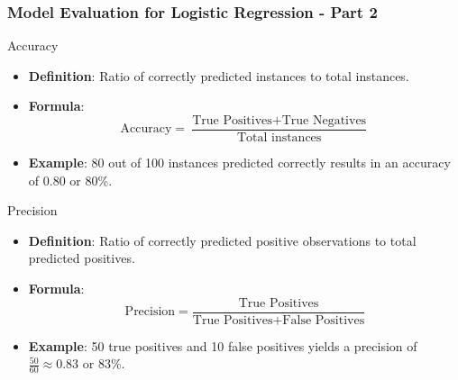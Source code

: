 \documentclass[aspectratio=169]{beamer}
\begin{document}
\begin{frame}[fragile]
    \frametitle{Model Evaluation for Logistic Regression - Part 2}
    
    \begin{block}{Accuracy}
        \begin{itemize}
            \item \textbf{Definition}: Ratio of correctly predicted instances to total instances.
            \item \textbf{Formula}:
            \begin{equation}
                \text{Accuracy} = \frac{\text{True Positives} + \text{True Negatives}}{\text{Total instances}}
            \end{equation}
            \item \textbf{Example}: 80 out of 100 instances predicted correctly results in an accuracy of \( 0.80 \) or 80\%.
        \end{itemize}
    \end{block}

    \begin{block}{Precision}
        \begin{itemize}
            \item \textbf{Definition}: Ratio of correctly predicted positive observations to total predicted positives.
            \item \textbf{Formula}:
            \begin{equation}
                \text{Precision} = \frac{\text{True Positives}}{\text{True Positives} + \text{False Positives}}
            \end{equation}
            \item \textbf{Example}: 50 true positives and 10 false positives yields a precision of \( \frac{50}{60} \approx 0.83 \) or 83\%.
        \end{itemize}
    \end{block}
\end{frame}
\end{document}
